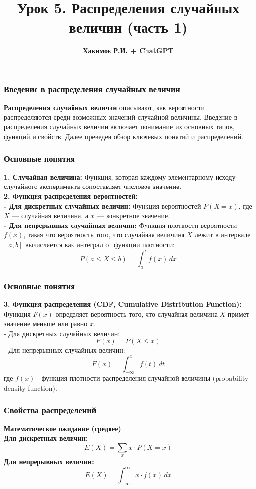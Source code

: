 \documentclass[aspectratio=169]{beamer}
\title{\bf Урок 5. Распределения случайных величин (часть 1)}
\author{{\bf Хакимов Р.И. + ChatGPT}}
\date[\today]{}
\begin{document}
\begin{frame}
\titlepage
\end{frame}

\begin{frame}
\frametitle{Введение в распределения случайных величин}
{\bf Распределения случайных величин} описывают, как вероятности распределяются среди возможных значений случайной величины. Введение в распределения случайных величин включает понимание их основных типов, функций и свойств. Далее преведен обзор ключевых понятий и распределений.
\end{frame}

\begin{frame}
\frametitle{Основные понятия}
{\bf 1. Случайная величина:} Функция, которая каждому элементарному исходу случайного эксперимента сопоставляет числовое значение.
\newline\\
{\bf 2. Функция распределения вероятностей:}\\
{\bf - Для дискретных случайных величин:} Функция вероятностей \( P(X = x) \), где \( X \) — случайная величина, а \( x \) — конкретное значение.\\
{\bf - Для непрерывных случайных величин:} Функция плотности вероятности \( f(x) \), такая что вероятность того, что случайная величина \( X \) лежит в интервале \([a, b]\) вычисляется как интеграл от функции плотности:
     \[
     P(a \leq X \leq b) = \int_{a}^{b} f(x) \, dx
     \]
\end{frame}

\begin{frame}
\frametitle{Основные понятия}
{\bf 3. Функция распределения (CDF, Cumulative Distribution Function):} Функция \( F(x) \) определяет вероятность того, что случайная величина \( X \) примет значение меньше или равно \( x \).\\
   - Для дискретных случайных величин:
     \[
     F(x) = P(X \leq x)
     \]
   - Для непрерывных случайных величин:
     \[
     F(x) = \int_{-\infty}^{x} f(t) \, dt
     \]
где $f(x)$ - функция плотности распределения случайной величины (probability density function).
\end{frame}

\begin{frame}
\frametitle{Свойства распределений}
{\bf Математическое ожидание (среднее)}
\newline\\
{\bf Для дискретных величин:}
     \[
     E(X) = \sum_{x} x \cdot P(X = x)
     \]
{\bf Для непрерывных величин:}
     \[
     E(X) = \int_{-\infty}^{\infty} x \cdot f(x) \, dx
     \]
\end{frame}
\end{document}
